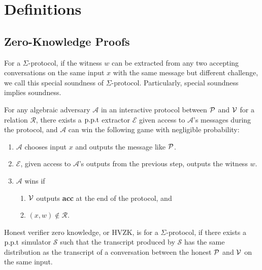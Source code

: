 
\chapter{Definitions}

\section{Zero-Knowledge Proofs}
\label{app:zkp}

\begin{definition}
For a $\Sigma$-protocol, if the witness $w$ can be extracted from any two accepting conversations on the same input $x$ with the same message but different challenge, we call this special soundness of $\Sigma$-protocol. Particularly, special soundness implies soundness.
\end{definition}

\begin{definition}
For any algebraic adversary $\mathcal{A}$ in an interactive protocol between $\mathcal{P}$ and $\mathcal{V}$ for a relation $\mathcal{R}$, there exists a $\text{p.p.t}$ extractor $\mathcal{E}$ given access to $\mathcal{A}$'s messages during the protocol, and $\mathcal{A}$ can win the following game with negligible probability:
\begin{enumerate}
    \item $\mathcal{A}$ chooses input $x$ and outputs the message like $\mathcal{P}$.
    \item $\mathcal{E}$, given access to $\mathcal{A}$'s outputs from the previous step, outputs the witness $w$.
    \item $\mathcal{A}$ wins if
    \begin{enumerate}
        \item $\mathcal{V}$ outputs \textbf{acc} at the end of the protocol, and
        \item $(x,w)\notin\mathcal{R}$.
    \end{enumerate}
\end{enumerate}
\end{definition}

\begin{definition}
Honest verifier zero knowledge, or HVZK, is for a $\Sigma$-protocol, if there exists a $\text{p.p.t}$ simulator $\mathcal{S}$ such that the transcript produced by $\mathcal{S}$ has the same distribution as the transcript of a conversation between the honest $\mathcal{P}$ and $\mathcal{V}$ on the same input.
\end{definition}

